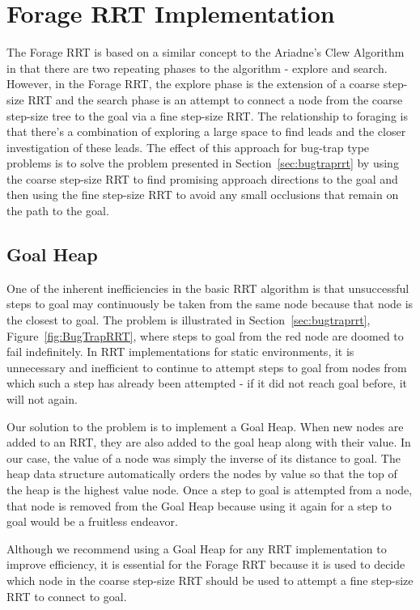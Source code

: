 \documentclass[conference]{IEEEtran}
\begin{document}
\section{Forage RRT Implementation}
\label{sec:implementation}
The Forage RRT is based on a similar concept to the Ariadne's Clew Algorithm \cite{bessiere93} in that there are two repeating phases to the
algorithm - explore and search. However, in the Forage RRT, the explore phase is the extension of a coarse step-size RRT and the search phase
is an attempt to connect a node from the coarse step-size tree to the goal via a fine step-size RRT. The relationship to foraging is that
there's a combination of exploring a large space to find leads and the closer investigation of these leads. The effect of this approach for
bug-trap type problems is to solve the problem presented in Section~\ref{sec:bugtraprrt} by using the coarse step-size RRT to find
promising approach directions to the goal and then using the fine step-size RRT to avoid any small occlusions that remain on the path to the
goal.

\subsection{Goal Heap}
One of the inherent inefficiencies in the basic RRT algorithm is that unsuccessful steps to goal may continuously be taken from the same
node because that node is the closest to goal. The problem is illustrated in Section~\ref{sec:bugtraprrt}, Figure~\ref{fig:BugTrapRRT},
where steps to goal from the red node are doomed to fail indefinitely. In RRT implementations for static environments, it is unnecessary and
inefficient to continue to attempt steps to goal from nodes from which such a step has already been attempted - if it did not reach goal
before, it will not again. 

Our solution to the problem is to implement a Goal Heap. When new nodes are added to an RRT, they are also added to the goal heap along
with their value. In our case, the value of a node was simply the inverse of its distance to goal. The heap data structure automatically
orders the nodes by value so that the top of the heap is the highest value node. Once a step to goal is attempted from a node, that node is
removed from the Goal Heap because using it again for a step to goal would be a fruitless endeavor.

Although we recommend using a Goal Heap for any RRT implementation to improve efficiency, it is essential for the Forage RRT because it is
used to decide which node in the coarse step-size RRT should be used to attempt a fine step-size RRT to connect to goal.
\end{document}
